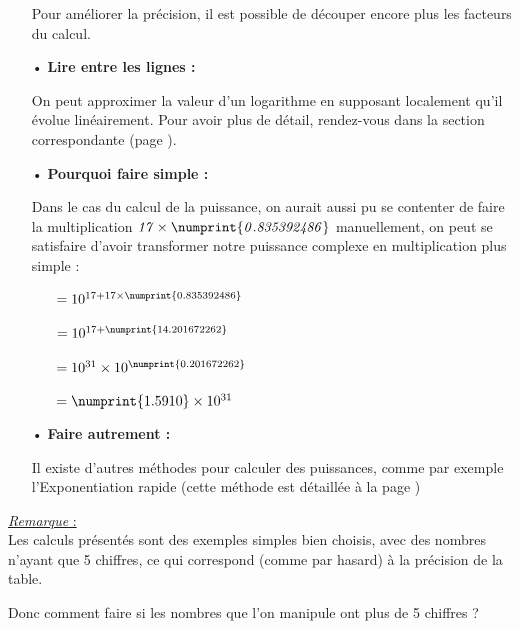 \documentclass[a4paper]{article}
\begin{document}
\begin{itemize}
\begin{small}
	Pour améliorer la précision, il est possible de découper encore plus les facteurs du calcul.
	
	\end{small}

	
	\vfill
	
	\item[•] \textbf{Lire entre les lignes :} 
	
	{\small On peut approximer la valeur d'un logarithme en supposant localement qu'il évolue linéairement. Pour avoir plus de détail, rendez-vous dans la section correspondante (page \pageref{approximation_lineaire}).}
	
	\vfill
	
	\item[•] \textbf{Pourquoi faire simple :} 
	
	\begin{small}
	Dans le cas du calcul de la puissance, on aurait aussi pu se contenter de faire la multiplication $\mathit{17 \times \numprint{0.835392486} }$ manuellement, on peut se satisfaire d'avoir transformer notre puissance complexe en multiplication plus simple :
	\vspace{0.1cm}
	
	\begin{itemize}
		\item[] $= 10^{17 + 17 \times \numprint{0.835 392 486}}$
		\item[] $= 10^{17 + \numprint{14.201672262}}$
		\item[] $= 10^{31} \times 10^{\numprint{0.201672262}}$
		\item[] $= \numprint{1.5910} \times 10 ^{31}$
	\end{itemize}
	\end{small}
	
	\vfill
	
	\item[•] \textbf{Faire autrement :} 
	
	{\small Il existe d'autres méthodes pour calculer des puissances, comme par exemple l'Exponentiation rapide (cette méthode est détaillée à la page \pageref{exponentiation_rapide})}

\end{itemize}

\vfill

{\noindent\underline{\textit{Remarque} :}}\\

\vspace{-2mm}
Les calculs présentés sont des exemples simples bien choisis, avec des nombres n'ayant que 5 chiffres, ce qui correspond (comme par hasard) à la précision de la table.
	\begin{center}
	Donc comment faire si les nombres que l'on manipule ont plus de 5 chiffres ?
	\end{center}
	
\end{document}
